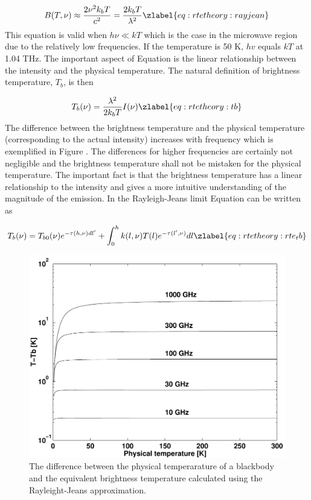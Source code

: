  \begin{equation}
   B(T,\nu) \approx \frac{2\nu^2k_bT}{c^2} = \frac{2k_bT}{\lambda^2}
  \zlabel{eq:rtetheory:rayjean}
 \end{equation}  
 This equation is valid when $h\nu \ll kT$ which is the case in the
 microwave region due to the relatively low frequencies. If the
 temperature is 50 K, $hv$ equals $kT$ at 1.04 THz. The important
 aspect of Equation  is the linear relationship
 between the intensity and the physical temperature. The natural
 definition of brightness temperature, $T_b$, is then

 \begin{equation}
   T_b(\nu) = \frac{\lambda^2}{2k_bT} I(\nu)
  \zlabel{eq:rtetheory:tb}
 \end{equation}  
 The difference between the brightness temperature and the physical
 temperature (corresponding to the actual intensity) increases with
 frequency which is exemplified in Figure . The
 differences for higher frequencies are certainly not negligible and
 the brightness temperature shall not be mistaken for the physical
 temperature. The important fact is that the brightness temperature
 has a linear relationship to the intensity and gives a more intuitive
 understanding of the magnitude of the emission. In the Rayleigh-Jeans
 limit Equation  can be written as

 \begin{equation}
   T_b(\nu) = T_{b0}(\nu)e^{-\tau(h,\nu)dl'} + 
     \int^h_0{k(l,\nu)T(l) e^{-\tau(l',\nu)} dl}
  \zlabel{eq:rtetheory:rte_tb}
 \end{equation}  

 \begin{figure}
  \begin{center}
    \includegraphics*[width=0.8\hsize]{fig_rayjean}
    \caption{The difference between the physical temperarature of a 
             blackbody and the equivalent brightness temperature
             calculated using the Rayleight-Jeans approximation.}
  \end{center}
 \end{figure} 
  

